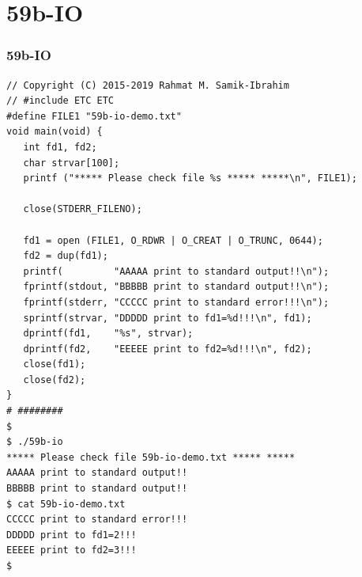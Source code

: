 \documentclass[xcolor=table, notheorems, hyperref={pdfpagelabels=false}]{beamer}
\begin{document}
\section{59b-IO}
\begin{frame}[fragile]
\frametitle{59b-IO}
\begin{lstlisting}[basicstyle=\ttfamily\tiny]
// Copyright (C) 2015-2019 Rahmat M. Samik-Ibrahim
// #include ETC ETC
#define FILE1 "59b-io-demo.txt"
void main(void) {
   int fd1, fd2;
   char strvar[100];
   printf ("***** Please check file %s ***** *****\n", FILE1);

   close(STDERR_FILENO);

   fd1 = open (FILE1, O_RDWR | O_CREAT | O_TRUNC, 0644);
   fd2 = dup(fd1);
   printf(         "AAAAA print to standard output!!\n"); 
   fprintf(stdout, "BBBBB print to standard output!!\n"); 
   fprintf(stderr, "CCCCC print to standard error!!!\n");
   sprintf(strvar, "DDDDD print to fd1=%d!!!\n", fd1);
   dprintf(fd1,    "%s", strvar);
   dprintf(fd2,    "EEEEE print to fd2=%d!!!\n", fd2);
   close(fd1);
   close(fd2);
}
# ########
$ 
$ ./59b-io 
***** Please check file 59b-io-demo.txt ***** *****
AAAAA print to standard output!!
BBBBB print to standard output!!
$ cat 59b-io-demo.txt 
CCCCC print to standard error!!!
DDDDD print to fd1=2!!!
EEEEE print to fd2=3!!!
$ 

\end{lstlisting}
\end{frame}

\end{document}
